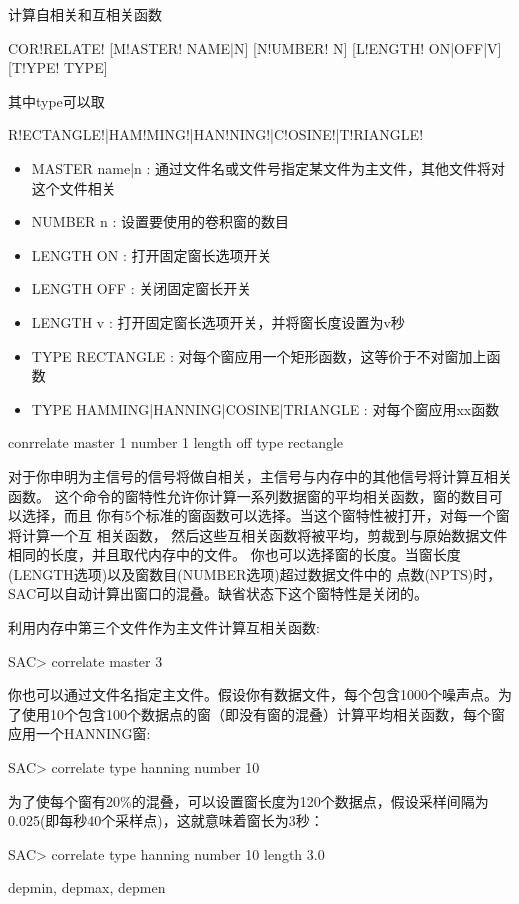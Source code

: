 \label{cmd:correlate}

计算自相关和互相关函数

\begin{SACSTX}
COR!RELATE! [M!ASTER! NAME|N] [N!UMBER! N] [L!ENGTH! ON|OFF|V] [T!YPE! TYPE]
\end{SACSTX}
其中type可以取
\begin{SACSTX}
R!ECTANGLE!|HAM!MING!|HAN!NING!|C!OSINE!|T!RIANGLE!
\end{SACSTX}

\begin{itemize}
\item MASTER name|n : 通过文件名或文件号指定某文件为主文件，其他文件将对这个文件相关
\item NUMBER n : 设置要使用的卷积窗的数目
\item LENGTH ON : 打开固定窗长选项开关
\item LENGTH OFF : 关闭固定窗长开关
\item LENGTH v : 打开固定窗长选项开关，并将窗长度设置为v秒
\item TYPE RECTANGLE : 对每个窗应用一个矩形函数，这等价于不对窗加上函数
\item TYPE HAMMING|HANNING|COSINE|TRIANGLE : 对每个窗应用xx函数
\end{itemize}

\begin{SACDFT}
conrrelate master 1 number 1 length off type rectangle
\end{SACDFT}

对于你申明为主信号的信号将做自相关，主信号与内存中的其他信号将计算互相关函数。
这个命令的窗特性允许你计算一系列数据窗的平均相关函数，窗的数目可以选择，而且
你有5个标准的窗函数可以选择。当这个窗特性被打开，对每一个窗将计算一个互	相关函数，
然后这些互相关函数将被平均，剪裁到与原始数据文件相同的长度，并且取代内存中的文件。
你也可以选择窗的长度。当窗长度(LENGTH选项)以及窗数目(NUMBER选项)超过数据文件中的
点数(NPTS)时，SAC可以自动计算出窗口的混叠。缺省状态下这个窗特性是关闭的。

利用内存中第三个文件作为主文件计算互相关函数:
\begin{SACCode}
SAC> correlate master 3
\end{SACCode}

你也可以通过文件名指定主文件。假设你有数据文件，每个包含1000个噪声点。为了使用10个包含100个数据点的窗（即没有窗的混叠）计算平均相关函数，每个窗应用一个HANNING窗:
\begin{SACCode}
SAC> correlate type hanning number 10
\end{SACCode}

为了使每个窗有20\%的混叠，可以设置窗长度为120个数据点，假设采样间隔为0.025(即每秒40个采样点)，这就意味着窗长为3秒：
\begin{SACCode}
SAC> correlate type hanning number 10 length 3.0
\end{SACCode}

depmin, depmax, depmen

